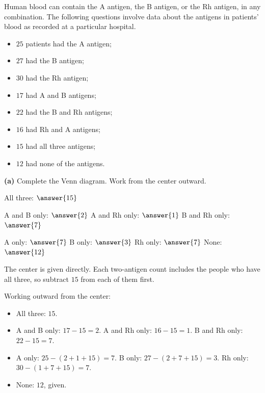 \documentclass[12pt]{ximera}
\begin{document}
\begin{problem}
Human blood can contain the A antigen, the B antigen, or the Rh antigen, in any
combination. The following questions involve data about the antigens in patients'
blood as recorded at a particular hospital.

\begin{itemize}
    \item $25$ patients had the A antigen;
    \item $27$ had the B antigen;
    \item $30$ had the Rh antigen;
    \item $17$ had A and B antigens;
    \item $22$ had the B and Rh antigens;
    \item $16$ had Rh and A antigens;
    \item $15$ had all three antigens;
    \item $12$ had none of the antigens.
\end{itemize}

\begin{prompt}
\textbf{(a)} Complete the Venn diagram. Work from the center outward.

\begin{center}
\end{center}

All three: $\answer{15}$

\smallskip
A and B only: $\answer{2}$ \qquad
A and Rh only: $\answer{1}$ \qquad
B and Rh only: $\answer{7}$

\smallskip
A only: $\answer{7}$ \qquad
B only: $\answer{3}$ \qquad
Rh only: $\answer{7}$ \qquad
None: $\answer{12}$

\begin{hint}
The center is given directly. Each two-antigen count includes the people who have all
three, so subtract $15$ from each of them first.
\end{hint}

\begin{solution}
Working outward from the center:
\begin{itemize}
\item All three: $15$.
\item A and B only: $17-15=2$. \quad A and Rh only: $16-15=1$. \quad
      B and Rh only: $22-15=7$.
\item A only: $25-(2+1+15)=7$. \quad B only: $27-(2+7+15)=3$. \quad
      Rh only: $30-(1+7+15)=7$.
\item None: $12$, given.
\end{itemize}
\end{solution}
\end{prompt}


\end{problem}
\end{document}
